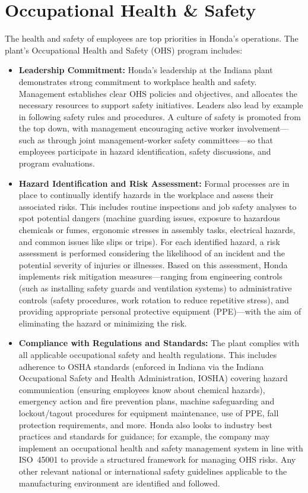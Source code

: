 \section{Occupational Health \& Safety}
The health and safety of employees are top priorities in Honda's operations. The plant’s Occupational Health and Safety (OHS) program includes:
\begin{itemize}
    \item \textbf{Leadership Commitment:} Honda’s leadership at the Indiana plant demonstrates strong commitment to workplace health and safety. Management establishes clear OHS policies and objectives, and allocates the necessary resources to support safety initiatives. Leaders also lead by example in following safety rules and procedures. A culture of safety is promoted from the top down, with management encouraging active worker involvement---such as through joint management-worker safety committees---so that employees participate in hazard identification, safety discussions, and program evaluations.
    \item \textbf{Hazard Identification and Risk Assessment:} Formal processes are in place to continually identify hazards in the workplace and assess their associated risks. This includes routine inspections and job safety analyses to spot potential dangers (machine guarding issues, exposure to hazardous chemicals or fumes, ergonomic stresses in assembly tasks, electrical hazards, and common issues like slips or trips). For each identified hazard, a risk assessment is performed considering the likelihood of an incident and the potential severity of injuries or illnesses. Based on this assessment, Honda implements risk mitigation measures—ranging from engineering controls (such as installing safety guards and ventilation systems) to administrative controls (safety procedures, work rotation to reduce repetitive stress), and providing appropriate personal protective equipment (PPE)—with the aim of eliminating the hazard or minimizing the risk.
    \item \textbf{Compliance with Regulations and Standards:} The plant complies with all applicable occupational safety and health regulations. This includes adherence to OSHA standards (enforced in Indiana via the Indiana Occupational Safety and Health Administration, IOSHA) covering hazard communication (ensuring employees know about chemical hazards), emergency action and fire prevention plans, machine safeguarding and lockout/tagout procedures for equipment maintenance, use of PPE, fall protection requirements, and more. Honda also looks to industry best practices and standards for guidance; for example, the company may implement an occupational health and safety management system in line with ISO~45001 to provide a structured framework for managing OHS risks. Any other relevant national or international safety guidelines applicable to the manufacturing environment are identified and followed.

\end{itemize}
